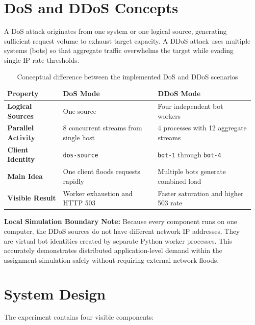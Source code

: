 \documentclass[11pt,a4paper]{article}
\begin{document}
\section{DoS and DDoS Concepts}
A DoS attack originates from one system or one logical source, generating sufficient request volume to exhaust target capacity. A DDoS attack uses multiple systems (bots) so that aggregate traffic overwhelms the target while evading single-IP rate thresholds.

\begin{table}[H]
\centering
\small
\caption{Conceptual difference between the implemented DoS and DDoS scenarios}
\label{tab:concepts}
\begin{tabularx}{\textwidth}{p{3.2cm}XX}
\toprule
\textbf{Property} & \textbf{DoS Mode} & \textbf{DDoS Mode} \\
\midrule
\textbf{Logical Sources}      & One source & Four independent bot workers \\
\textbf{Parallel Activity}    & 8 concurrent streams from single host & 4 processes with 12 aggregate streams \\
\textbf{Client Identity}      & \texttt{dos-source} & \texttt{bot-1} through \texttt{bot-4} \\
\textbf{Main Idea}            & One client floods requests rapidly & Multiple bots generate combined load \\
\textbf{Visible Result}       & Worker exhaustion and HTTP 503 & Faster saturation and higher 503 rate \\
\bottomrule
\end{tabularx}
\end{table}

\noindent\textbf{Local Simulation Boundary Note:} Because every component runs on one computer, the DDoS sources do not have different network IP addresses. They are virtual bot identities created by separate Python worker processes. This accurately demonstrates distributed application-level demand within the assignment simulation safely without requiring external network floods.

\section{System Design}
The experiment contains four visible components:
\end{document}
